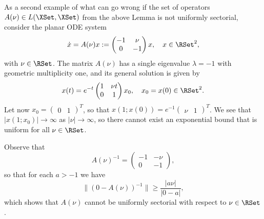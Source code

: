 \documentclass[a4paper]{siamart190516}
\begin{document}
  \begin{remark}
 As a second example of what can go wrong if the set of operators $A(\nu) \in L(\XSet,\XSet)$ from the above Lemma is not uniformly sectorial, consider the planar ODE system
 \begin{equation}
 \begin{aligned}
 \dot{x} = A(\nu) x := \begin{pmatrix} -1 & \nu \\ 0 & -1 \end{pmatrix} x, \quad x \in \RSet^2,
 \end{aligned}
 \end{equation}
 with $\nu \in \RSet$. The matrix $A(\nu)$ has a single eigenvalue $\lambda = -1$ with geometric multiplicity one, and its general solution is given by
 \[
x(t) = e^{-t} \begin{pmatrix} 1 & \nu t \\ 0 & 1 \end{pmatrix} x_0, \quad x_0 = x(0) \in \RSet^2.
 \]
Let now $x_0 = \begin{pmatrix} 0 & 1 \end{pmatrix}^T$, so that $x(1; x(0)) = e^{-1}  \begin{pmatrix} \nu & 1 \end{pmatrix}^T$. We see that $|x(1; x_0)| \rightarrow \infty$ as $|\nu| \rightarrow \infty$, so there cannot exist an exponential bound that is uniform for all $\nu \in \RSet$.

Observe that 
\[
A(\nu)^{-1} = \begin{pmatrix} -1 & -\nu \\ 0 & -1 \end{pmatrix} ,
\]
so that for each $a > -1$ we have
\[
\| (0 - A(\nu))^{-1} \| \geq \frac{ |a \nu|} {|0 - a|},
\]
which shows that $A(\nu)$ cannot be uniformly sectorial with respect to $\nu \in \RSet$. 
 \end{remark}
 
\end{document}
